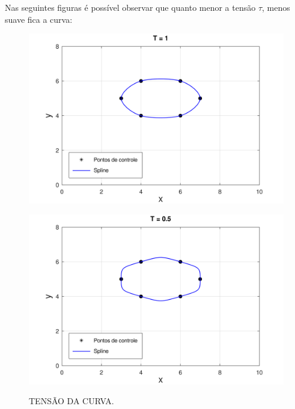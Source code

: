 Nas seguintes figuras é possível observar que quanto menor a tensão $\tau$, menos suave fica a curva:

\begin{figure}[h!]
    \caption{TENSÃO DA CURVA.}
    \centering
    \begin{minipage}[b]{0.45\textwidth}
        \centering
        \includegraphics[width=1\linewidth]{fig/cat_rom_t1.png}
        \label{fig:tesao1}
    \end{minipage}
    \hfill
    \begin{minipage}[b]{0.45\textwidth}
        \centering
        \includegraphics[width=1\linewidth]{fig/cat_rom_t05.png}
        \label{fig:tensao05}
    \end{minipage}

    \vspace{1cm}


\end{figure}
